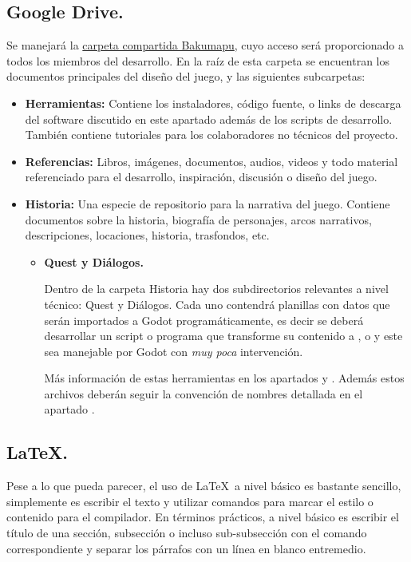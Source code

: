 \subsection{Google Drive.}\label{flujo:google-drive}
Se manejará la \href{https://drive.google.com/open?id=1p8u-1UpXts8OHGRHEZLSIiQrqqx0Y4Kt}{carpeta compartida Bakumapu}, cuyo acceso será proporcionado a todos los miembros del desarrollo. En la raíz de esta carpeta se encuentran los documentos principales del diseño del juego, y las siguientes subcarpetas:
\begin{itemize}
	\item \textbf{Herramientas:} Contiene los instaladores, código fuente, o links de descarga del software discutido en este apartado además de los scripts de desarrollo. También contiene tutoriales para los colaboradores no técnicos del proyecto.
	\item \textbf{Referencias:} Libros, imágenes, documentos, audios, videos y todo material referenciado para el desarrollo, inspiración, discusión o diseño del juego.
	\item \textbf{Historia:} Una especie de repositorio para la narrativa del juego. Contiene documentos sobre la historia, biografía de personajes, arcos narrativos, descripciones, locaciones, historia, trasfondos, etc.
	\begin{itemize}
		\item \textbf{Quest y Diálogos.}
		
		Dentro de la carpeta Historia hay dos subdirectorios relevantes a nivel técnico: Quest y Diálogos. Cada uno contendrá planillas con datos que serán importados a Godot programáticamente, es decir se deberá desarrollar un script o programa que transforme su contenido a ,  o  y este sea manejable por Godot con \emph{muy poca} intervención.
		
		Más información de estas herramientas en los apartados  y . Además estos archivos deberán seguir la convención de nombres detallada en el apartado .
	\end{itemize}
\end{itemize}


\subsection{LaTeX.}\label{flujo:latex}
Pese a lo que pueda parecer, el uso de \LaTeX\ a nivel básico es bastante sencillo, simplemente es escribir el texto y utilizar comandos para marcar el estilo o contenido para el compilador. En términos prácticos, a nivel básico es escribir el título de una sección, subsección o incluso sub-subsección con el comando correspondiente y separar los párrafos con un línea en blanco entremedio.

